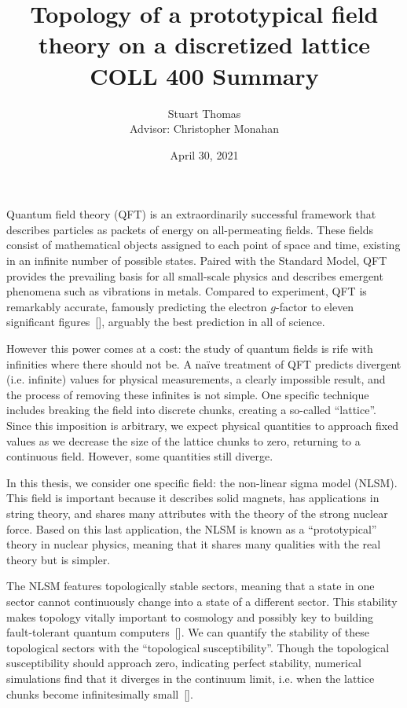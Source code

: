 \documentclass[english,11pt]{article}
\renewcommand{\cite}[1]{[\footfullcite{#1}]}
\begin{document}
\setlength{\baselineskip}{24pt}

\title{ Topology of a prototypical field theory on a discretized lattice\vspace{0.5cm} %
\\ \large\sc COLL 400 Summary }
\author{Stuart Thomas \\ Advisor: Christopher Monahan}
\date{April 30, 2021}
\maketitle

\indent Quantum field theory (QFT) is an extraordinarily successful framework that describes particles as packets of energy on all-permeating fields. These fields consist of mathematical objects assigned to each point of space and time, existing in an infinite number of possible states. Paired with the Standard Model, QFT provides the prevailing basis for all small-scale physics and describes emergent phenomena such as vibrations in metals. Compared to experiment, QFT is remarkably accurate, famously predicting the electron $g$-factor to eleven significant figures~\cite{odom2006}, arguably the best prediction in all of science.

However this power comes at a cost: the study of quantum fields is rife with infinities where there should not be. A na\"ive treatment of QFT predicts divergent (i.e. infinite) values for physical measurements, a clearly impossible result, and the process of removing these infinites is not simple. One specific technique includes breaking the field into discrete chunks, creating a so-called ``lattice''. Since this imposition is arbitrary, we expect physical quantities to approach fixed values as we decrease the size of the lattice chunks to zero, returning to a continuous field. However, some quantities still diverge.

In this thesis, we consider one specific field: the non-linear sigma model (NLSM). This field is important because it describes solid magnets, has applications in string theory, and shares many attributes with the theory of the strong nuclear force. Based on this last application, the NLSM is known as a ``prototypical'' theory in nuclear physics, meaning that it shares many qualities with the real theory but is simpler.

The NLSM features topologically stable sectors, meaning that a state in one sector cannot continuously change into a state of a different sector. This stability makes topology vitally important to cosmology and possibly key to building fault-tolerant quantum computers~\cite{kitaev1997}. We can quantify the stability of these topological sectors with the ``topological susceptibility''. Though the topological susceptibility should approach zero, indicating perfect stability, numerical simulations find that it diverges in the continuum limit, i.e. when the lattice chunks become infinitesimally small~\cite{berg1981}.
\end{document}
